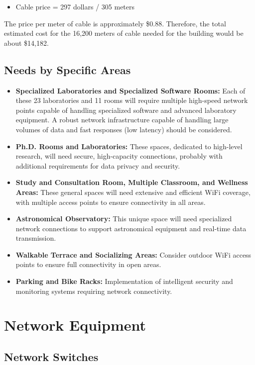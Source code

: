 \documentclass[12pt]{article}
\begin{document}
\begin{itemize}
    \item Cable price = 297 dollars / 305 meters
\end{itemize}

The price per meter of cable is approximately \$0.88. Therefore, the total estimated cost for the 16,200 meters of cable needed for the building would be about \$14,182.

\subsection{Needs by Specific Areas}

\begin{itemize}
    \item \textbf{Specialized Laboratories and Specialized Software Rooms:} Each of these 23 laboratories and 11 rooms will require multiple high-speed network points capable of handling specialized software and advanced laboratory equipment. A robust network infrastructure capable of handling large volumes of data and fast responses (low latency) should be considered.
    \item \textbf{Ph.D. Rooms and Laboratories:} These spaces, dedicated to high-level research, will need secure, high-capacity connections, probably with additional requirements for data privacy and security.
    \item \textbf{Study and Consultation Room, Multiple Classroom, and Wellness Areas:} These general spaces will need extensive and efficient WiFi coverage, with multiple access points to ensure connectivity in all areas.
    \item \textbf{Astronomical Observatory:} This unique space will need specialized network connections to support astronomical equipment and real-time data transmission.
    \item \textbf{Walkable Terrace and Socializing Areas:} Consider outdoor WiFi access points to ensure full connectivity in open areas.
    \item \textbf{Parking and Bike Racks:} Implementation of intelligent security and monitoring systems requiring network connectivity.
\end{itemize}

\section{Network Equipment}

\subsection{Network Switches}
\end{document}
